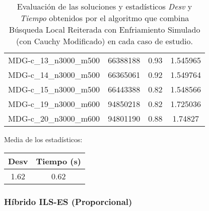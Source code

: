 \documentclass{article}
\begin{document}
\begin{table}[H]
\begin{tabular}{|cccc|}
		MDG-c\_13\_n3000\_m500 & 66388188 & 0.93 & 1.545965\\
		MDG-c\_14\_n3000\_m500 & 66365061 & 0.92 & 1.549764\\
		MDG-c\_15\_n3000\_m500 & 66443388 & 0.82 & 1.548566\\
		MDG-c\_19\_n3000\_m600 & 94850218 & 0.82 & 1.725036\\
		MDG-c\_20\_n3000\_m600 & 94801190 & 0.88 & 1.74827\\
		\hline
	\end{tabular}
	\caption{Evaluación de las soluciones y estadísticos \emph{Desv} y \emph{Tiempo} obtenidos por el algoritmo que combina
		Búsqueda Local Reiterada con Enfriamiento Simulado (con Cauchy Modificado) en cada caso de estudio.}
	\label{tab:ils-es}
\end{table}

Media de los estadísticos:
\begin{table}[H]
	\centering
	\begin{tabular}{|cc|}
		\hline
		Desv & Tiempo (s)\\ \hline
		1.62 & 0.62 \\
		\hline
	\end{tabular}
\end{table}

\pagebreak

\subsubsection*{Híbrido ILS-ES (Proporcional)}
\end{document}
